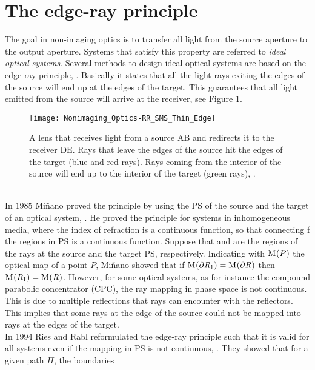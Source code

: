 \section{The edge-ray principle}
The goal in non-imaging optics is to transfer all light from the source aperture to the output aperture. Systems that satisfy this property are referred to \textit{ideal optical systems}.
Several methods to design ideal optical systems are based on the edge-ray principle, \cite{welford1978problem, minano1992new}. 
Basically it states that all the light rays exiting the edges of the source will end up at the edges of the target. 
This guarantees that all light emitted from the source will arrive at the receiver, see Figure \ref{fig:edge}. 
 \begin{figure}[h]
  \begin{center}
  \texttt{[image: Nonimaging\_Optics-RR\_SMS\_Thin\_Edge]}
  \end{center}
  \caption{A lens that receives light from a source $\textrm{A}\textrm{B}$ and redirects it to the receiver $\textrm{D}\textrm{E}$. 
Rays that leave the edges of the source hit the edges of the target (blue and red rays). Rays coming from the interior of the source will end up to the interior of the target (green rays), \cite{wiki2}.}
  \label{fig:edge}
\end{figure}
\\ \indent
In $1985$ Mi{\~n}ano proved the principle by using the PS of the source and the target of an optical system, \cite{minano1986design}. He proved the principle for systems in inhomogeneous media, where the index of refraction is a continuous function, so that connecting f the regions in PS is a continuous function.
Suppose that  and  are the regions of the rays at the source and the target PS, respectively. 
Indicating with $\mathrm{M}_{\textit{}}(P)$ the optical map of a point $P$, Mi{\~n}ano showed that if $\mathrm{M}_{\textit{}}(\partial\mbox{$\emph{R}_{\textit{$1$}}$})=\mathrm{M}_{\textit{}}(\partial\mbox{$\emph{R}_{\textit{}}$})$ then $\mathrm{M}_{\textit{}}(\mbox{$\emph{R}_{\textit{$1$}}$})=\mathrm{M}_{\textit{}}(\mbox{$\emph{R}_{\textit{}}$})$. However, for some optical systems, as for instance the compound parabolic concentrator (CPC), the ray mapping in phase space is not continuous. This is due to multiple reflections that rays can encounter with the reflectors. 
This implies that some rays at the edge of the source could not be mapped into rays at the edges of the target. \\ \indent 
In 1994 Ries and Rabl reformulated the edge-ray principle such that it is valid for all systems even if the mapping in PS is not continuous, \cite{Ries:2}. They showed that for a given path $\Pi$, the boundaries
